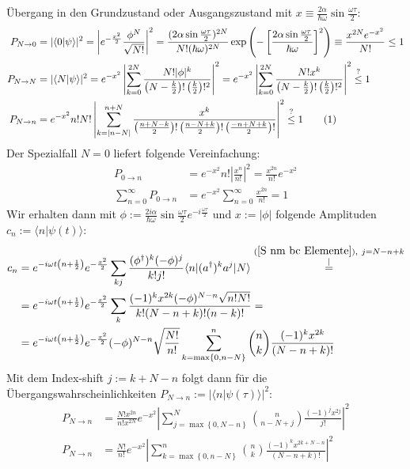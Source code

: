 \documentclass[a4paper,12pt]{article}
\newcommand\numberthis{\addtocounter{equation}{1}\tag{\theequation}}
\newcommand{\kom}{}
\newcommand{\brak}{}
\newcommand{\braket}{}
\newcommand{\kla}{}
\newcommand{\klam}{}
\newcommand{\klammer}{}
\begin{document}
Übergang in den Grundzustand oder Ausgangszustand mit $x\equiv\frac{2\alpha}{\hbar\omega}\sin\frac{\omega\tau}{2}$:
\begin{align*}
P_{N\rightarrow 0}&=|\brak\langle {0}| {\psi}\rangle|^2=\left\vert e^{-\frac{x^2}{2}}\frac{\phi^N}{\sqrt{N!}}\right\vert^2=\frac{(2\alpha\sin\frac{\omega\tau}{2})^{2N}}{N!(\hbar\omega)^{2N}}\exp\kla\left( {-\klam\left[ {\frac{2\alpha\sin\frac{\omega\tau}{2}}{\hbar\omega}} \right]^2} \right)\equiv\frac{x^{2N}e^{-x^2}}{N!}\le 1\\
P_{N\rightarrow N}&=|\brak\langle {N}| {\psi}\rangle|^2=e^{-x^2}\left\vert\sum_{k=0}^{2N}\frac{N!|\phi|^k}{\kla\left( {N-\frac{k}{2}} \right)!\kla\left( {\frac{k}{2}} \right)!^2}  \right\vert^2=e^{-x^2}\left\vert\sum_{k=0}^{2N}\frac{N!x^k}{\kla\left( {N-\frac{k}{2}} \right)!\kla\left( {\frac{k}{2}} \right)!^2}  \right\vert^2\overset{?}{\le}1\\
P_{N\rightarrow n}&=e^{-x^2}n!N!\left\vert\sum_{k=|n-N|}^{n+N}\frac{x^k}{\kla\left( {\frac{n+N-k}{2}} \right)!\kla\left( {\frac{n-N+k}{2}} \right)!\kla\left( {\frac{-n+N+k}{2}} \right)!}  \right\vert^2\overset{?}{\le}1\numberthis\label{PNn}
\end{align*}
Der Spezialfall $N=0$ liefert folgende Vereinfachung:
\begin{align*}
P_{0\rightarrow n}&=e^{-x^2}n!\left\vert\frac{x^n}{n!}\right\vert^2=\frac{x^{2n}}{n!}e^{-x^2}\\
\sum_{n=0}^\infty P_{0\rightarrow n}&=e^{-x^2}\sum_{n=0}^\infty\frac{x^{2n}}{n!}=1
\end{align*}
Wir erhalten dann mit $\phi:=\frac{2i\alpha}{\hbar\omega}\sin\frac{\omega\tau}{2}e^{-i\frac{\omega\tau}{2}}$ und $x:=|\phi|$ folgende Amplituden $c_n:=\brak\langle {n}| {\psi(t)}\rangle$:
\begin{align*}
c_n&=e^{-i\omega t\kla\left( {n+\frac{1}{2}} \right)}e^{-\frac{x^2}{2}}\sum_{kj}\frac{(\phi^\dagger)^k(-\phi)^j}{k!j!}\braket\langle {n} | {(a^\dagger)^ka^j} | {N}\rangle\kom\overset{\substack{{(\ref{S nm bc Elemente}),\ j=N-n+k} \\ |}}{=}\\
&=e^{-i\omega t\kla\left( {n+\frac{1}{2}} \right)}e^{-\frac{x^2}{2}}\sum_{k}\frac{(-1)^kx^{2k}(-\phi)^{N-n}\sqrt{n!N!}}{k!(N-n+k)!(n-k)!}=\\
&=e^{-i\omega t\kla\left( {n+\frac{1}{2}} \right)}e^{-\frac{x^2}{2}}(-\phi)^{N-n}\sqrt{\frac{N!}{n!}}\sum_{k=\max\klammer\left\{{0,n-N} \right\}}^n\binom{n}{k}\frac{(-1)^kx^{2k}}{(N-n+k)!}
\end{align*}
Mit dem Index-shift $j:=k+N-n$ folgt dann für die Übergangswahrscheinlichkeiten $P_{N\rightarrow n}:=|\brak\langle {n}| {\psi(\tau)}\rangle|^2$:
\begin{align*}
P_{N\rightarrow n}&=\frac{N!x^{2n}}{n!x^{2N}}e^{-x^2}\left\vert\sum_{j=\max\klammer\left\{{0,N-n} \right\}}^N\binom{n}{n-N+j}\frac{(-1)^jx^{2j}}{j!}\right\vert^2\\
P_{N\rightarrow n}&=\frac{N!}{n!}e^{-x^2}\left\vert\sum_{k=\max\klammer\left\{{0,n-N} \right\}}^{n}\binom{n}{k}\frac{(-1)^kx^{2k+N-n}}{(N-n+k)!}\right\vert^2
\end{align*}
\end{document}
